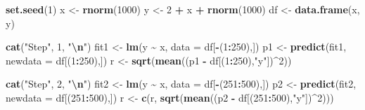 \documentclass[
]{article}
\newenvironment{Shaded}{\begin{snugshade}}{\end{snugshade}}
\newcommand{\AttributeTok}[1]{\textcolor[rgb]{0.13,0.29,0.53}{#1}}
\newcommand{\DecValTok}[1]{\textcolor[rgb]{0.00,0.00,0.81}{#1}}
\newcommand{\FunctionTok}[1]{\textcolor[rgb]{0.13,0.29,0.53}{\textbf{#1}}}
\newcommand{\NormalTok}[1]{#1}
\newcommand{\OtherTok}[1]{\textcolor[rgb]{0.56,0.35,0.01}{#1}}
\newcommand{\SpecialCharTok}[1]{\textcolor[rgb]{0.81,0.36,0.00}{\textbf{#1}}}
\newcommand{\StringTok}[1]{\textcolor[rgb]{0.31,0.60,0.02}{#1}}
\begin{document}
\begin{Shaded}
\begin{Highlighting}[]
\FunctionTok{set.seed}\NormalTok{(}\DecValTok{1}\NormalTok{) }
\NormalTok{x }\OtherTok{\textless{}{-}} \FunctionTok{rnorm}\NormalTok{(}\DecValTok{1000}\NormalTok{)}
\NormalTok{y }\OtherTok{\textless{}{-}} \DecValTok{2} \SpecialCharTok{+}\NormalTok{ x }\SpecialCharTok{+} \FunctionTok{rnorm}\NormalTok{(}\DecValTok{1000}\NormalTok{)}
\NormalTok{df }\OtherTok{\textless{}{-}} \FunctionTok{data.frame}\NormalTok{(x, y)}

\FunctionTok{cat}\NormalTok{(}\StringTok{"Step"}\NormalTok{, }\DecValTok{1}\NormalTok{, }\StringTok{"}\SpecialCharTok{\textbackslash{}n}\StringTok{"}\NormalTok{)}
\NormalTok{fit1 }\OtherTok{\textless{}{-}} \FunctionTok{lm}\NormalTok{(y }\SpecialCharTok{\textasciitilde{}}\NormalTok{ x, }\AttributeTok{data =}\NormalTok{ df[}\SpecialCharTok{{-}}\NormalTok{(}\DecValTok{1}\SpecialCharTok{:}\DecValTok{250}\NormalTok{),])}
\NormalTok{p1 }\OtherTok{\textless{}{-}} \FunctionTok{predict}\NormalTok{(fit1, }\AttributeTok{newdata =}\NormalTok{ df[(}\DecValTok{1}\SpecialCharTok{:}\DecValTok{250}\NormalTok{),])}
\NormalTok{r }\OtherTok{\textless{}{-}} \FunctionTok{sqrt}\NormalTok{(}\FunctionTok{mean}\NormalTok{((p1 }\SpecialCharTok{{-}}\NormalTok{ df[(}\DecValTok{1}\SpecialCharTok{:}\DecValTok{250}\NormalTok{),}\StringTok{"y"}\NormalTok{])}\SpecialCharTok{\^{}}\DecValTok{2}\NormalTok{))  }

\FunctionTok{cat}\NormalTok{(}\StringTok{"Step"}\NormalTok{, }\DecValTok{2}\NormalTok{, }\StringTok{"}\SpecialCharTok{\textbackslash{}n}\StringTok{"}\NormalTok{)}
\NormalTok{fit2 }\OtherTok{\textless{}{-}} \FunctionTok{lm}\NormalTok{(y }\SpecialCharTok{\textasciitilde{}}\NormalTok{ x, }\AttributeTok{data =}\NormalTok{ df[}\SpecialCharTok{{-}}\NormalTok{(}\DecValTok{251}\SpecialCharTok{:}\DecValTok{500}\NormalTok{),])}
\NormalTok{p2 }\OtherTok{\textless{}{-}} \FunctionTok{predict}\NormalTok{(fit2, }\AttributeTok{newdata =}\NormalTok{ df[(}\DecValTok{251}\SpecialCharTok{:}\DecValTok{500}\NormalTok{),])}
\NormalTok{r }\OtherTok{\textless{}{-}} \FunctionTok{c}\NormalTok{(r, }\FunctionTok{sqrt}\NormalTok{(}\FunctionTok{mean}\NormalTok{((p2 }\SpecialCharTok{{-}}\NormalTok{ df[(}\DecValTok{251}\SpecialCharTok{:}\DecValTok{500}\NormalTok{),}\StringTok{"y"}\NormalTok{])}\SpecialCharTok{\^{}}\DecValTok{2}\NormalTok{)))}


\end{Highlighting}
\end{Shaded}
\end{document}
